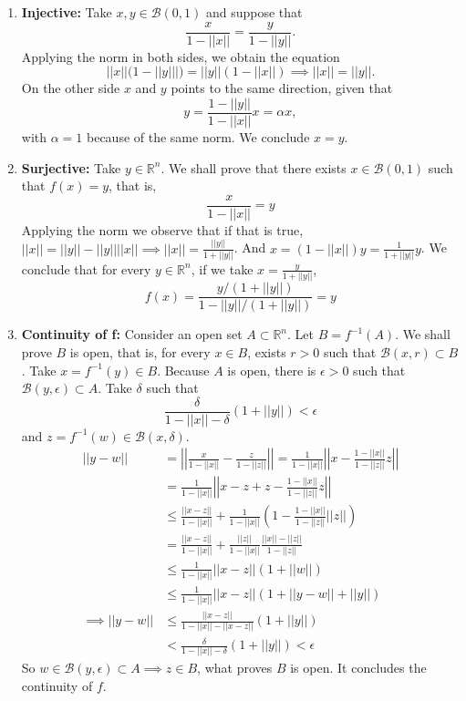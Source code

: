 \documentclass[a4paper,11pt]{article}
\theoremstyle{mytheor}
\theoremstyle{mytheor}
\theoremstyle{remark}
\newcommand{\B}{\mathcal{B}}
\newcommand{\R}{\mathbb{R}}
\begin{document}
\begin{enumerate}
    \item \textbf{Injective:} Take $x, y \in \B(0,1)$ and suppose that  
    $$
    \frac{x}{1 - ||x||} = \frac{y}{1 - ||y||}. 
    $$
    Applying the norm in both sides, we obtain the equation 
    $$||x||(1 - ||y|||) = ||y||(1 - ||x||) \implies ||x|| = ||y||.$$
    On the other side $x$ and $y$ points to the same direction, given that 
    $$
    y = \frac{1 - ||y||}{1 - ||x||}x = \alpha x, 
    $$
    with $\alpha = 1$ because of the same norm. We conclude $x = y$. 

    \item \textbf{Surjective:} Take $y \in \R^n$. We shall prove that there
    exists $x \in \B(0,1)$ such that $f(x) = y$, that is, 
    $$
    \frac{x}{1 - ||x||} = y
    $$
    Applying the norm we observe that if that is true, $||x|| = ||y|| -
    ||y||||x|| \implies ||x|| = \frac{||y||}{1 + ||y||}$. And $x = (1 -
    ||x||)y = \frac{1}{1 + ||y||}y$. We conclude that for every $y \in \R^n$,
    if we take $x = \frac{y}{1 + ||y||}$,
    $$
    f(x) = \frac{y/(1 + ||y||)}{1 - ||y||/(1 + ||y||)} = y
    $$

    \item \textbf{Continuity of f:} Consider an open set $A \subset \R^n$. Let
    $B = f^{-1}(A)$. We shall prove $B$ is open, that is, for every $x \in B$,
    exists $r > 0$ such that $\B(x, r) \subset B$. Take $x = f^{-1}(y) \in B$.
    Because $A$ is open, there is $\epsilon > 0$ such that $\B(y, \epsilon)
    \subset A$. Take $\delta$ such that 
    $$
    \frac{\delta}{1 - ||x|| - \delta}(1 + ||y||) < \epsilon
    $$
    and $z = f^{-1}(w) \in \B(x,\delta)$. 
    \begin{equation*}
        \begin{split}
            ||y - w|| &= \left|\left|\frac{x}{1 - ||x||} - \frac{z}{1 - ||z||}\right|\right| = \frac{1}{1 - ||x||}\left|\left|x - \frac{1 - ||x||}{1 - ||z||}z\right|\right| \\ 
            &= \frac{1}{1 - ||x||}\left|\left|x - z + z - \frac{1 - ||x||}{1 - ||z||}z\right|\right| \\
            &\le \frac{||x-z||}{1 - ||x||} + \frac{1}{1 - ||x||}\left(1 - \frac{1 - ||x||}{1 - ||z||}||z||\right) \\
            &= \frac{||x-z||}{1 - ||x||} + \frac{||z||}{1 - ||x||}\frac{||x|| - ||z||}{1 - ||z||} \\
            &\le \frac{1}{1 - ||x||}||x-z||(1 + ||w||) \\
            &\le \frac{1}{1 - ||x||}||x-z||(1 + ||y - w|| + ||y||) \\
            \implies ||y - w|| &\le \frac{||x-z||}{1 - ||x|| - ||x-z||}(1 + ||y||) \\ 
            &< \frac{\delta}{1 - ||x|| - \delta}(1 + ||y||) < \epsilon
        \end{split}
    \end{equation*}
    So $w \in \B(y, \epsilon) \subset A \implies z \in B$, what proves $B$ is
    open. It concludes the continuity of $f$. 


\end{enumerate}
\end{document}
